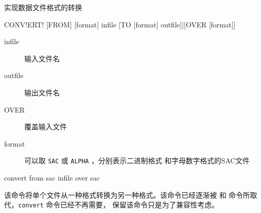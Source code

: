 \label{cmd:convert}

实现数据文件格式的转换

\begin{SACSTX}
CONV!ERT! [FROM] [format] infile [TO [format] outfile]|[OVER [format]]
\end{SACSTX}

\begin{description}
\item [infile] 输入文件名
\item [outfile] 输出文件名
\item [OVER] 覆盖输入文件
\item [format] 可以取 \texttt{SAC} 或 \texttt{ALPHA} ，分别表示二进制格式
    和字母数字格式的SAC文件
\end{description}

\begin{SACDFT}
convert from sac infile over sac
\end{SACDFT}

该命令将单个文件从一种格式转换为另一种格式。该命令已经逐渐被 
和  命令所取代，\texttt{convert} 命令已经不再需要，
保留该命令只是为了兼容性考虑。
